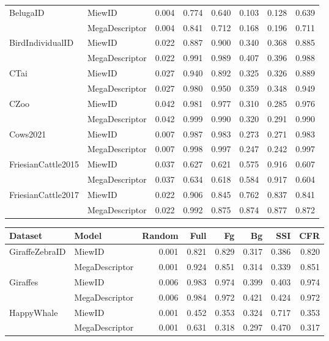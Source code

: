 \begin{table}[!t]
\begin{tabular}[t]{@{}llrrrrrr@{}}
\midrule
BelugaID & MiewID & 0.004 & 0.774 & 0.640 & 0.103 & 0.128 & 0.639 \\
 & MegaDescriptor & 0.004 & 0.841 & 0.712 & 0.168 & 0.196 & 0.711 \\
\midrule
BirdIndividualID & MiewID & 0.022 & 0.887 & 0.900 & 0.340 & 0.368 & 0.885 \\
 & MegaDescriptor & 0.022 & 0.991 & 0.989 & 0.407 & 0.396 & 0.988 \\
\midrule
CTai & MiewID & 0.027 & 0.940 & 0.892 & 0.325 & 0.326 & 0.889 \\
 & MegaDescriptor & 0.027 & 0.980 & 0.950 & 0.359 & 0.348 & 0.949 \\
\midrule
CZoo & MiewID & 0.042 & 0.981 & 0.977 & 0.310 & 0.285 & 0.976 \\
 & MegaDescriptor & 0.042 & 0.999 & 0.990 & 0.320 & 0.291 & 0.990 \\
\midrule
Cows2021 & MiewID & 0.007 & 0.987 & 0.983 & 0.273 & 0.271 & 0.983 \\
 & MegaDescriptor & 0.007 & 0.998 & 0.997 & 0.247 & 0.242 & 0.997 \\
\midrule
FriesianCattle2015 & MiewID & 0.037 & 0.627 & 0.621 & 0.575 & 0.916 & 0.607 \\
 & MegaDescriptor & 0.037 & 0.634 & 0.618 & 0.584 & 0.917 & 0.604 \\
\midrule
FriesianCattle2017 & MiewID & 0.022 & 0.906 & 0.845 & 0.762 & 0.837 & 0.841 \\
 & MegaDescriptor & 0.022 & 0.992 & 0.875 & 0.874 & 0.877 & 0.872 \\
\bottomrule
\end{tabular}
\hfill
\begin{tabular}[t]{@{}llrrrrrr@{}}
\toprule
\textbf{Dataset} & \textbf{Model} & \textbf{Random} & \textbf{Full} & \textbf{Fg} & \textbf{Bg} & \textbf{SSI} & \textbf{CFR} \\
\midrule
GiraffeZebraID & MiewID & 0.001 & 0.821 & 0.829 & 0.317 & 0.386 & 0.820 \\
 & MegaDescriptor & 0.001 & 0.924 & 0.851 & 0.314 & 0.339 & 0.851 \\
\midrule
Giraffes & MiewID & 0.006 & 0.983 & 0.974 & 0.399 & 0.403 & 0.974 \\
 & MegaDescriptor & 0.006 & 0.984 & 0.972 & 0.421 & 0.424 & 0.972 \\
\midrule
HappyWhale & MiewID & 0.001 & 0.452 & 0.353 & 0.324 & 0.717 & 0.353 \\
 & MegaDescriptor & 0.001 & 0.631 & 0.318 & 0.297 & 0.470 & 0.317 \\

\end{tabular}
\end{table}
